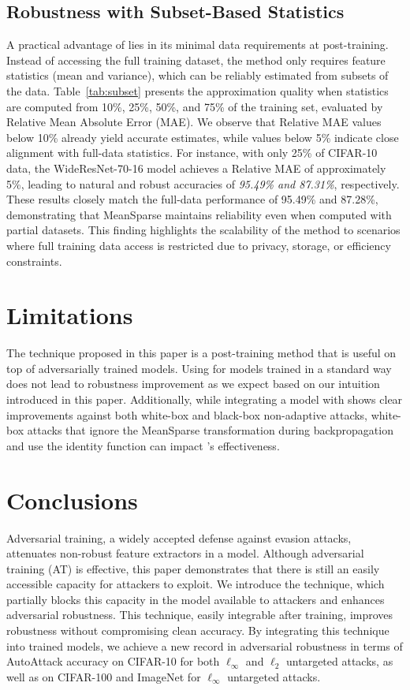 \documentclass[conference]{IEEEtran}
\begin{document}
\subsection{Robustness with Subset-Based Statistics}



A practical advantage of \sys lies in its minimal data requirements at post-training. Instead of accessing the full training dataset, the method only requires feature statistics (mean and variance), which can be reliably estimated from subsets of the data. Table~\ref{tab:subset} presents the approximation quality when statistics are computed from 10\%, 25\%, 50\%, and 75\% of the training set, evaluated by Relative Mean Absolute Error (MAE). We observe that Relative MAE values below 10\% already yield accurate estimates, while values below 5\% indicate close alignment with full-data statistics. For instance, with only 25\% of CIFAR-10 data, the WideResNet-70-16 model achieves a Relative MAE of approximately 5\%, leading to natural and robust accuracies of \emph{95.49\% and 87.31\%}, respectively. These results closely match the full-data performance of 95.49\% and 87.28\%, demonstrating that MeanSparse maintains reliability even when computed with partial datasets. This finding highlights the scalability of the method to scenarios where full training data access is restricted due to privacy, storage, or efficiency constraints.




\section{Limitations} \label{sec:limitation}
The \sys technique proposed in this paper is a post-training method that is useful on top of adversarially trained models. Using \sys for models trained in a standard way does not lead to robustness improvement as we expect based on our intuition introduced in this paper. Additionally, while integrating a model with \sys shows clear improvements against both white-box and black-box non-adaptive attacks, white-box attacks that ignore the MeanSparse transformation during backpropagation and use the identity function can impact \sys's effectiveness.


\section{Conclusions}
Adversarial training, a widely accepted defense against evasion attacks, attenuates non-robust feature extractors in a model. Although adversarial training (AT) is effective, this paper demonstrates that there is still an easily accessible capacity for attackers to exploit. We introduce the \sys technique, which partially blocks this capacity in the model available to attackers and enhances adversarial robustness. This technique, easily integrable after training, improves robustness without compromising clean accuracy. By integrating this technique into trained models, we achieve a new record in adversarial robustness in terms of AutoAttack accuracy on CIFAR-10 for both $\ell_\infty$ and $\ell_2$ untargeted attacks, as well as on CIFAR-100 and ImageNet for $\ell_\infty$ untargeted attacks. 
\end{document}
